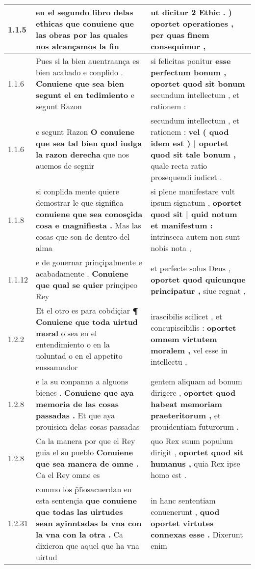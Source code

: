 \begin{tabular}{|p{1cm}|p{6.5cm}|p{6.5cm}|}

\hline
1.1.5 & en el segundo libro delas ethicas \textbf{ que conuiene que las obras } por las quales nos alcançamos la fin & ut dicitur 2 Ethic . ) \textbf{ oportet operationes , } per quas finem consequimur , \\\hline
1.1.6 & Pues si la bien auentraança es bien acabado e conplido . \textbf{ Conuiene que sea bien segunt el en tedimiento } e segunt Razon & si felicitas ponitur \textbf{ esse perfectum bonum , oportet quod sit bonum } secundum intellectum , et rationem : \\\hline
1.1.6 & e segunt Razon \textbf{ O conuiene que sea tal bien qual iudga la razon derecha } que nos auemos de segnir & secundum intellectum , et rationem : \textbf{ vel ( quod idem est ) | oportet quod sit tale bonum , } quale recta ratio prosequendi iudicet . \\\hline
1.1.8 & si conplida mente quiere demostrar le que significa \textbf{ conuiene que sea conosçida cosa e magnifiesta . } Mas las cosas que son de dentro del alma & si plene manifestare vult ipsum signatum , \textbf{ oportet quod sit | quid notum et manifestum : } intrinseca autem non sunt nobis nota , \\\hline
1.1.12 & e de gouernar prinçipalmente e acabadamente . \textbf{ Conuiene que qual se quier } prinçipeo Rey & et perfecte solus Deus , \textbf{ oportet quod quicunque principatur , } siue regnat , \\\hline
1.2.2 & Et el otro es para cobdiçiar \textbf{ ¶ Conuiene que toda uirtud moral } o sea en el entendimiento o en la uoluntad o en el appetito enssannador & irascibilis scilicet , et concupiscibilis : \textbf{ oportet omnem virtutem moralem , } vel esse in intellectu , \\\hline
1.2.8 & e la su conpanna a alguons bienes . \textbf{ Conuiene que aya memoria de las cosas passadas . } Et que aya prouision delas cosas passadas & gentem aliquam ad bonum dirigere , \textbf{ oportet quod habeat memoriam praeteritorum , } et prouidentiam futurorum . \\\hline
1.2.8 & Ca la manera por que el Rey guia el su pueblo \textbf{ Conuiene que sea manera de omne . } Ca el Rey omne es & quo Rex suum populum dirigit , \textbf{ oportet quod sit humanus , } quia Rex ipse homo est . \\\hline
1.2.31 & commo los p̃h̃osacuerdan en esta sentençia \textbf{ que conuiene que todas las uirtudes sean ayinntadas la vna con la vna con la otra . } Ca dixieron que aquel que ha vna uirtud & in hanc sententiam conuenerunt , \textbf{ quod oportet virtutes connexas esse . } Dixerunt enim \\\hline

\end{tabular}
